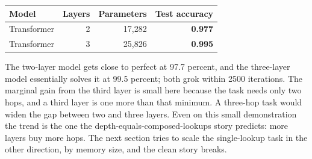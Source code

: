 \begin{center}
\begin{tabular}{@{}lrrr@{}}
\toprule
Model & Layers & Parameters & Test accuracy \\
\midrule
Transformer & 2 & 17{,}282 & \textbf{0.977} \\
Transformer & 3 & 25{,}826 & \textbf{0.995} \\
\bottomrule
\end{tabular}
\end{center}

The two-layer model gets close to perfect at 97.7 percent, and the three-layer
model essentially solves it at 99.5 percent; both grok within 2500 iterations.
The marginal gain from the third layer is small here because the task needs
only two hops, and a third layer is one more than that minimum. A three-hop
task would widen the gap between two and three layers. Even on this small
demonstration the trend is the one the depth-equals-composed-lookups story
predicts: more layers buy more hops. The next section tries to scale the
single-lookup task in the other direction, by memory size, and the clean
story breaks.

